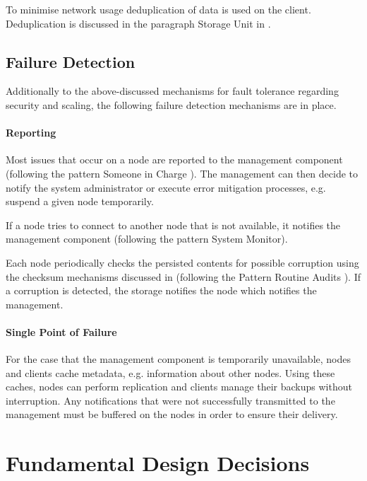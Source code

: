 To minimise network usage deduplication of data is used on the \gls{client}. Deduplication is  discussed in the paragraph Storage Unit in  .

\subsection{Failure Detection}

Additionally to the above-discussed mechanisms for fault tolerance regarding security and scaling, the following failure detection mechanisms are in place.

\paragraph{Reporting} Most issues that occur on a \gls{node} are reported to the \gls{management} component (following the pattern Someone in Charge \cite{fault-tolerance}). The \gls{management} can then decide to notify the system administrator or execute error mitigation processes, e.g. suspend a given \gls{node} temporarily.

If a \gls{node} tries to connect to another \gls{node} that is not available, it notifies the \gls{management} component (following the pattern System Monitor\cite{fault-tolerance}).

Each \gls{node} periodically checks the persisted contents for possible corruption using the checksum mechanisms discussed in  (following the Pattern Routine Audits \cite{fault-tolerance}). If a corruption is detected, the \gls{storage} notifies the \gls{node} which notifies the \gls{management}.

\paragraph{Single Point of Failure} For the case that the \gls{management} component is temporarily unavailable, \glspl{node} and \glspl{client} cache metadata, e.g. information about other \glspl{node}. Using these caches, \glspl{node} can perform replication and \glspl{client} manage their backups without interruption. Any notifications that were not successfully transmitted to the \gls{management} must be buffered on the \glspl{node} in order to ensure their delivery.

\section{Fundamental Design Decisions}\label{sec:fundamental-design-decisions}

